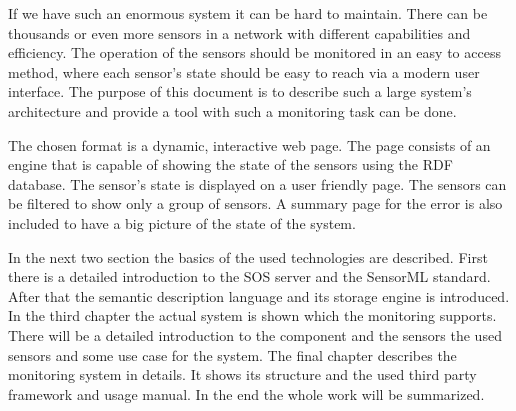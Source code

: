 If we have such an enormous system it can be hard to maintain. There can be thousands or even more sensors in a network with different capabilities and efficiency. The operation of the sensors should be monitored in an easy to access method, where each sensor's state should be easy to reach via a modern user interface. The purpose of this document is to describe such a large system's architecture and provide a tool with such a monitoring task can be done.

The chosen format is a dynamic, interactive web page. The page consists of an engine that is capable of showing the state of the sensors using the RDF database. The sensor's state is displayed on a user friendly page. The sensors can be filtered to show only a group of sensors. A summary page for the error is also included to have a big picture of the state of the system. 

In the next two section the basics of the used technologies are described. First there is a detailed introduction to the SOS server and the SensorML standard. After that the semantic description language and its storage engine is introduced. 
In the third chapter the actual system is shown which the monitoring supports. 
There will be a detailed introduction to the component and the sensors the used sensors and some use case for the system. The final chapter describes the monitoring system in details. It shows its structure and the used third party framework and usage manual. In the end the whole work will be summarized. 


